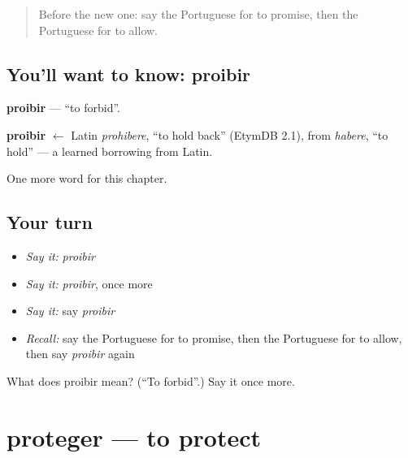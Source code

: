 \label{lesson:PT-C140-proibir}



\begin{quote}
Before the new one: say the Portuguese for to promise, then the Portuguese for to allow.
\end{quote}

\subsection*{You'll want to know: proibir}
\textbf{proibir} — \textquotedblleft{}to forbid\textquotedblright{}.

\begin{cousinweb}
\textbf{proibir} $\leftarrow$ Latin \emph{prohibere}, \textquotedblleft{}to hold back\textquotedblright{} (EtymDB 2.1), from \emph{habere}, \textquotedblleft{}to hold\textquotedblright{} — a learned borrowing from Latin.
\end{cousinweb}

\begin{grammarlens}[title={What you've built}]
One more word for this chapter.
\end{grammarlens}

\subsection*{Your turn}
\begin{itemize}
\raggedright
  \item \emph{Say it:} \emph{proibir}
  \item \emph{Say it:} \emph{proibir}, once more
  \item \emph{Say it:} say \emph{proibir}
  \item \emph{Recall:} say the Portuguese for to promise, then the Portuguese for to allow, then say \emph{proibir} again
\end{itemize}

\begin{tcolorbox}[breakable,colback=teal!4,colframe=teal!35!black,title={Before you move on}]
What does proibir mean? (\textquotedblleft{}To forbid\textquotedblright{}.) Say it once more.
\end{tcolorbox}
\section[proteger]{proteger — to protect}

\label{lesson:PT-C140-proteger}



